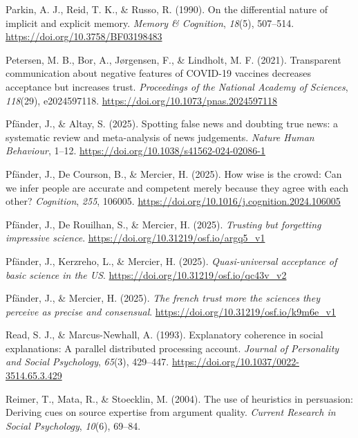 \documentclass[
  jou,
  floatsintext,
  longtable,
  nolmodern,
  notxfonts,
  notimes,
  colorlinks=true,linkcolor=blue,citecolor=blue,urlcolor=blue]{apa7}
\newlength{\cslhangindent}
\newenvironment{CSLReferences}[2] %
 {\begin{list}{}{%
  \setlength{\itemindent}{0pt}
  \setlength{\leftmargin}{0pt}
  \setlength{\parsep}{0pt}
  \ifodd #1
   \setlength{\leftmargin}{\cslhangindent}
   \setlength{\itemindent}{-1\cslhangindent}
  \fi
  \setlength{\itemsep}{#2\baselineskip}}}
 {\end{list}}
\begin{document}
\begin{CSLReferences}{1}{0}
Parkin, A. J., Reid, T. K., \& Russo, R. (1990). On the differential
nature of implicit and explicit memory. \emph{Memory \& Cognition},
\emph{18}(5), 507--514. \url{https://doi.org/10.3758/BF03198483}

Petersen, M. B., Bor, A., Jørgensen, F., \& Lindholt, M. F. (2021).
Transparent communication about negative features of COVID-19 vaccines
decreases acceptance but increases trust. \emph{Proceedings of the
National Academy of Sciences}, \emph{118}(29), e2024597118.
\url{https://doi.org/10.1073/pnas.2024597118}

Pfänder, J., \& Altay, S. (2025). Spotting false news and doubting true
news: a systematic review and meta-analysis of news judgements.
\emph{Nature Human Behaviour}, 1--12.
\url{https://doi.org/10.1038/s41562-024-02086-1}

Pfänder, J., De Courson, B., \& Mercier, H. (2025). How wise is the
crowd: Can we infer people are accurate and competent merely because
they agree with each other? \emph{Cognition}, \emph{255}, 106005.
\url{https://doi.org/10.1016/j.cognition.2024.106005}

Pfänder, J., De Rouilhan, S., \& Mercier, H. (2025). \emph{Trusting but
forgetting impressive science}.
\url{https://doi.org/10.31219/osf.io/argq5_v1}

Pfänder, J., Kerzreho, L., \& Mercier, H. (2025). \emph{Quasi-universal
acceptance of basic science in the US}.
\url{https://doi.org/10.31219/osf.io/qc43v_v2}

Pfänder, J., \& Mercier, H. (2025). \emph{The french trust more the
sciences they perceive as precise and consensual}.
\url{https://doi.org/10.31219/osf.io/k9m6e_v1}

Read, S. J., \& Marcus-Newhall, A. (1993). Explanatory coherence in
social explanations: A parallel distributed processing account.
\emph{Journal of Personality and Social Psychology}, \emph{65}(3),
429--447. \url{https://doi.org/10.1037/0022-3514.65.3.429}

Reimer, T., Mata, R., \& Stoecklin, M. (2004). The use of heuristics in
persuasion: Deriving cues on source expertise from argument quality.
\emph{Current Research in Social Psychology}, \emph{10}(6), 69--84.


\end{CSLReferences}
\end{document}
